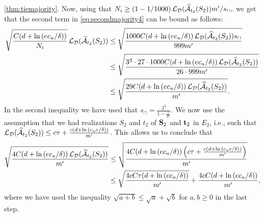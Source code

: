 \begin{proofof}{\cref{thm:tiemajority}.}
Now, using that $ N_{i}\geq  (1-1/1000)\operatorname{\mathcal{L}}_{\mathcal{D}}(\widehat{\mathcal{A}}_{t_{2}}(S_{2}))m'/s_{\sqcap},$ we get that the second term in \cref{eq:secondmajority4} can be bound as follows:
\begin{align*}
\sqrt{\frac{C(d+\ln{\left(ec_{u}/\delta \right)})}{N_{i}}}\operatorname{\mathcal{L}}_{\mathcal{D}}(\widehat{\mathcal{A}}_{t_{2}}(S_{2}))
& \leq 
\sqrt{\frac{1000C(d+\ln{\left(ec_{u}/\delta \right)})\operatorname{\mathcal{L}}_{\mathcal{D}}(\widehat{\mathcal{A}}_{t_{2}}(S_{2}))s_{\sqcap}}{999m'}}
\nonumber  \\
& \leq\sqrt{\frac{3^{3}\cdot27\cdot 1000C(d+\ln{\left(ec_{u}/\delta \right)})\operatorname{\mathcal{L}}_{\mathcal{D}}(\widehat{\mathcal{A}}_{t_{2}}(S_{2}))}{26\cdot999m'}} \nonumber \\
& \leq\sqrt{\frac{29C(d+\ln{\left(ec_{u}/\delta \right)})\operatorname{\mathcal{L}}_{\mathcal{D}}(\widehat{\mathcal{A}}_{t_{2}}(S_{2}))}{m'}}.
\end{align*}
In the second inequality we have used that $ s_{\sqcap}=\frac{3^{3}}{1-\frac{1}{27}}.$ 
We now use the assumption that we had realizations $ S_{2} $ and $ t_{2} $ of  $ \mathbf{S}_{2} $ and $ \mathbf{t}_{2} $ in $ E_{2} $, i.e., such that $\operatorname{\mathcal{L}}_{\mathcal{D}}(\widehat{\mathcal{A}}_{t_{2}}(S_{2}))\leq  c\tau+\frac{c\left(d+\ln{(c_{u}e/\delta )}\right)}{m'}$. This allows us to conclude that
\begin{align}\label{eq:secondmajority6}
\sqrt{\frac{4C(d+\ln{\left(ec_{u}/\delta \right)})\operatorname{\mathcal{L}}_{\mathcal{D}}(\widehat{\mathcal{A}}_{t_{2}}(S_{2}))}{m'}}
   &\leq \sqrt{\frac{4C(d+\ln{\left(ec_{u}/\delta \right)})\left(c\tau+\frac{c\left(d+\ln{(c_{u}e/\delta )}\right)}{m'}\right)}{m'}}
   \\
   &\leq \sqrt{\frac{4cC\tau(d+\ln{\left(ec_{u}/\delta \right)})}{m'}}+\frac{4cC(d+\ln{\left(ec_{u}/\delta \right)})}{m'},
\end{align}
where we have used the inequality $ \sqrt{a+b}\leq \sqrt{a}+\sqrt{b} $ for $ a,b\geq0 $ in the last step.


\end{proofof}
